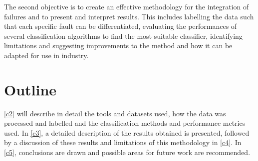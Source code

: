 The second objective is to create an effective methodology for the integration
of failures and to present and interpret results. This includes labelling the
data such that each specific fault can be differentiated, evaluating the
performances of several classification algorithms to find the most suitable
classifier, identifying limitations and suggesting improvements to the method
and how it can be adapted for use in industry.

\section{Outline}

\autoref{c2} will describe in detail the tools and datasets used, how the data
was processed and labelled and the classification methods and performance
metrics used. In \autoref{c3}, a detailed description of the results obtained
is presented, followed by a discussion of these results and limitations of
this methodology in \autoref{c4}. In \autoref{c5}, conclusions are drawn and
possible areas for future work are recommended.
